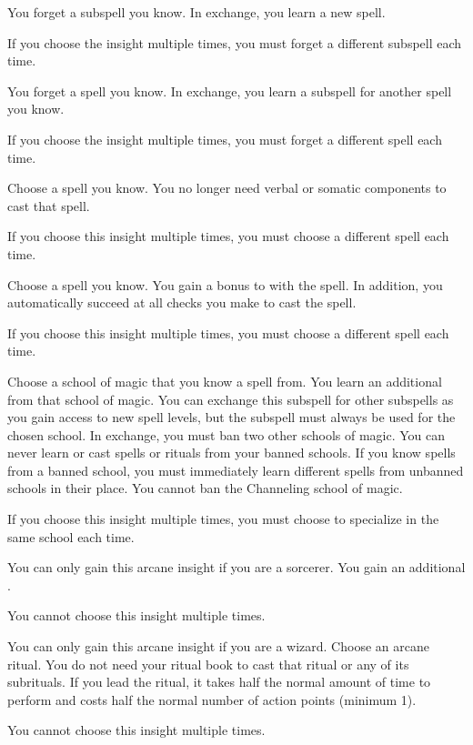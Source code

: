         {
             You forget a subspell you know.
            In exchange, you learn a new spell.
            \par If you choose the insight multiple times, you must forget a different subspell each time.

             You forget a spell you know.
            In exchange, you learn a subspell for another spell you know.
            \par If you choose the insight multiple times, you must forget a different spell each time.

             Choose a spell you know.
            You no longer need verbal or somatic components to cast that spell.
            \par If you choose this insight multiple times, you must choose a different spell each time.

             Choose a spell you know.
            You gain a  bonus to  with the spell.
            In addition, you automatically succeed at all  checks you make to cast the spell.
            \par If you choose this insight multiple times, you must choose a different spell each time.

             Choose a school of magic that you know a spell from.
            You learn an additional  from that school of magic.
            You can exchange this subspell for other subspells as you gain access to new spell levels, but the subspell must always be used for the chosen school.
            In exchange, you must ban two other schools of magic.
            You can never learn or cast spells or rituals from your banned schools.
            If you know spells from a banned school, you must immediately learn different spells from unbanned schools in their place.
            You cannot ban the Channeling school of magic.
            \par If you choose this insight multiple times, you must choose to specialize in the same school each time.

             You can only gain this arcane insight if you are a sorcerer.
            You gain an additional .
            \par You cannot choose this insight multiple times.

             You can only gain this arcane insight if you are a wizard.
            Choose an arcane ritual.
            You do not need your ritual book to cast that ritual or any of its subrituals.
            If you lead the ritual, it takes half the normal amount of time to perform and costs half the normal number of action points (minimum 1).
            \par You cannot choose this insight multiple times.
        }

